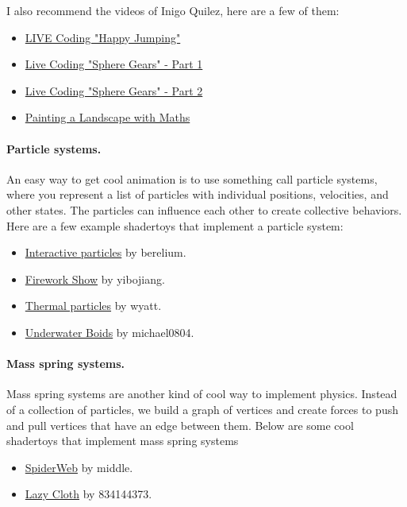 I also recommend the videos of Inigo Quilez, here are a few of them:
\begin{itemize}
	\item \href{https://www.youtube.com/watch?v=Cfe5UQ-1L9Q}{LIVE Coding "Happy Jumping"}
	\item \href{https://www.youtube.com/watch?v=sl9x19EnKng}{Live Coding "Sphere Gears" - Part 1}
	\item \href{https://www.youtube.com/watch?v=bdICU2uvOdU}{Live Coding "Sphere Gears" - Part 2}
	\item \href{https://www.youtube.com/watch?v=BFld4EBO2RE}{Painting a Landscape with Maths}
\end{itemize}

\paragraph{Particle systems.} An easy way to get cool animation is to use something call particle systems, where you represent a list of particles with individual positions, velocities, and other states. The particles can influence each other to create collective behaviors. Here are a few example shadertoys that implement a particle system:
\begin{itemize}
	\item \href{https://www.shadertoy.com/view/McXXzH}{Interactive particles} by berelium.
	\item \href{https://www.shadertoy.com/view/Xl2SRR}{Firework Show} by yibojiang.
	\item \href{https://www.shadertoy.com/view/4tKBDc}{Thermal particles} by wyatt.
	\item \href{https://www.shadertoy.com/view/WdSfzD}{Underwater Boids} by michael0804.
\end{itemize}

\paragraph{Mass spring systems.} Mass spring systems are another kind of cool way to implement physics. Instead of a collection of particles, we build a graph of vertices and create forces to push and pull vertices that have an edge between them. Below are some cool shadertoys that implement mass spring systems
\begin{itemize}
	\item \href{https://www.shadertoy.com/view/4fc3zf}{SpiderWeb} by middle.
	\item \href{https://www.shadertoy.com/view/llyBDW}{Lazy Cloth} by 834144373.
\end{itemize}

